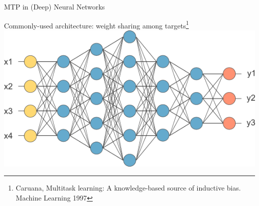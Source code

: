 \documentclass[]{beamer}
\newcommand{\bx}{\boldsymbol{x}}
\begin{document}
%
%
%
%
%
%
%
%
%

\begin{frame}{MTP in (Deep) Neural Networks}
\begin{center}
Commonly-used architecture: weight sharing among targets\footnote{Caruana, Multitask learning: A knowledge-based source of inductive bias. Machine
Learning 1997} \\
\vspace{0.2cm}
\includegraphics[scale=0.6]{Figures/weightsharing}
\end{center}
\end{frame}
\end{document}
